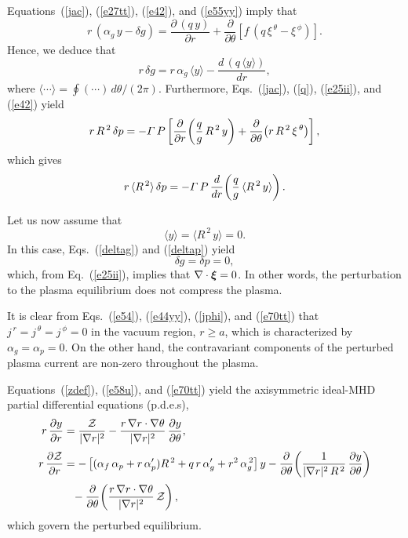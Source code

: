 \documentclass[12pt,prb,aps]{revtex4-1}
\newcommand {\bxi}{\mbox{\boldmath$\xi$}}
\begin{document}
Equations~(\ref{jac}), (\ref{e27tt}), (\ref{e42}), and (\ref{e55yy}) imply that
\begin{equation}
r\,(\alpha_g\,y-\delta g) = \frac{\partial\,(q\,y)}{\partial r} + \frac{\partial}{\partial\theta}\!\left[f\,(q\,\xi^{\,\theta}-\xi^{\,\phi})\right].
\end{equation}
Hence, we deduce that
\begin{equation}\label{deltag}
r\,\delta g = r\,\alpha_g\,\langle y\rangle - \frac{d\,(q\,\langle y\rangle)}{dr},
\end{equation}
where $\langle \cdots\rangle = \oint(\cdots)\,d\theta/(2\pi)$. Furthermore, Eqs.~(\ref{jac}), (\ref{q}), (\ref{e25ii}), and (\ref{e42})   yield\,\cite{tj}
\begin{equation}
r\,R^{\,2}\,\delta p = - {\mit\Gamma}\,P\left[\frac{\partial}{\partial r}\!\left(\frac{q}{g}\,R^{\,2}\,y\right)+\frac{\partial}{\partial\theta}\!\left(r\,R^{\,2}\,\xi^{\,\theta}\right)\right],
\end{equation}
which gives
\begin{equation}\label{deltap}
r\,\langle R^{\,2}\rangle\,\delta p = -{\mit\Gamma}\,P\,\frac{d}{dr}\!\left(\frac{q}{g}\,\langle R^{\,2}\,y\rangle\right).
\end{equation}

Let us now assume that 
\begin{equation}\label{sym}
\langle y\rangle = \langle R^{\,2}\,y\rangle = 0.
\end{equation}
In this case, Eqs.~(\ref{deltag}) and (\ref{deltap}) yield 
\begin{equation}\label{e70tt}
\delta g = \delta p = 0,
\end{equation}
 which, from Eq.~(\ref{e25ii}),  implies that $\nabla\cdot\bxi=0$. In other words, the perturbation to the plasma equilibrium does not compress the plasma. 

It is clear from Eqs.~(\ref{e54}), (\ref{e44yy}), (\ref{jphi}), and (\ref{e70tt}) that $j^{\,r}=j^{\,\theta}=j^{\,\phi}=0$ in the vacuum region, $r\geq a$, which is characterized by $\alpha_g=\alpha_p=0$. On the
other hand, the contravariant components of the perturbed plasma current are  non-zero throughout the plasma. 

Equations~(\ref{zdef}), (\ref{e58u}), and   (\ref{e70tt}) yield the  axisymmetric ideal-MHD partial differential equations (p.d.e.s),
\begin{align}\label{e63y}
r\,\frac{\partial y}{\partial r} &= \frac{{\cal Z}}{|\nabla r|^2} - \frac{r\,\nabla r\cdot\nabla\theta}{|\nabla r|^2}\,\frac{\partial y}{\partial\theta},\\[0.5ex]
r\,\frac{\partial {\cal Z}}{\partial r}&= -\left[(\alpha_f\,\alpha_p+ r\,\alpha_p')R^{\,2} + q\,r\,\alpha_g'+r^2\,\alpha_g^{\,2}\right]y-\frac{\partial}{\partial\theta}\!\left(\frac{1}{|\nabla r|^2\,R^{\,2}}\,\frac{\partial y}{\partial\theta}\right)\nonumber\\[0.5ex]
&\phantom{=} -\frac{\partial}{\partial\theta}\!\left(\frac{r\,\nabla r\cdot\nabla\theta}{|\nabla r|^2}\,{\cal Z}\right),\label{e64y}
\end{align}
which govern the perturbed equilibrium. 
\end{document}
